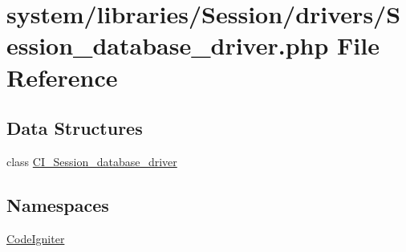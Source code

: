 \hypertarget{_session__database__driver_8php}{}\section{system/libraries/\+Session/drivers/\+Session\+\_\+database\+\_\+driver.php File Reference}
\label{_session__database__driver_8php}
\subsection*{Data Structures}
\begin{DoxyCompactItemize}
\item 
class \mbox{\hyperlink{class_c_i___session__database__driver}{C\+I\+\_\+\+Session\+\_\+database\+\_\+driver}}
\end{DoxyCompactItemize}
\subsection*{Namespaces}
\begin{DoxyCompactItemize}
\item 
 \mbox{\hyperlink{namespace_code_igniter}{Code\+Igniter}}
\end{DoxyCompactItemize}
